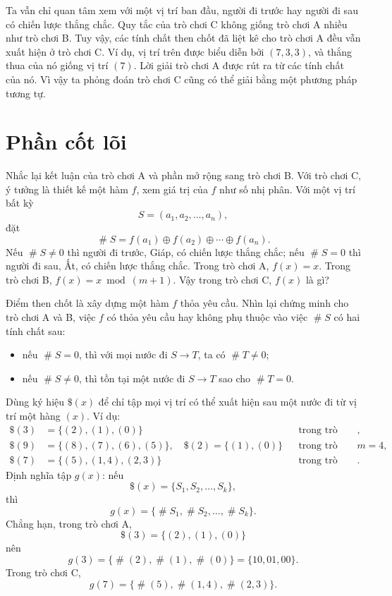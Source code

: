 \documentclass[11pt]{article}
\newcommand{\nimadd}{\oplus}
\newcommand{\val}[1]{\mathop{\#}\!#1}
\newcommand{\moves}[1]{\text{\$}(#1)}
\begin{document}
Ta vẫn chỉ quan tâm xem với một vị trí ban đầu, người đi trước hay người đi
sau có chiến lược thắng chắc. Quy tắc của trò chơi C không giống trò chơi A
nhiều như trò chơi B. Tuy vậy, các tính chất then chốt đã liệt kê cho trò
chơi A đều vẫn xuất hiện ở trò chơi C. Ví dụ, vị trí trên được biểu diễn bởi
\((7,3,3)\), và thắng thua của nó giống vị trí \((7)\). Lời giải trò chơi A
được rút ra từ các tính chất của nó. Vì vậy ta phỏng đoán trò chơi C cũng có
thể giải bằng một phương pháp tương tự.

\section{Phần cốt lõi}

Nhắc lại kết luận của trò chơi A và phần mở rộng sang trò chơi B. Với trò
chơi C, ý tưởng là thiết kế một hàm \(f\), xem giá trị của \(f\) như số nhị
phân. Với một vị trí bất kỳ
\[
  S=(a_1,a_2,\ldots,a_n),
\]
đặt
\[
  \val{S}=f(a_1)\nimadd f(a_2)\nimadd\cdots\nimadd f(a_n).
\]
Nếu \(\val{S}\ne0\) thì người đi trước, Giáp, có chiến lược thắng chắc; nếu
\(\val{S}=0\) thì người đi sau, Ất, có chiến lược thắng chắc. Trong trò chơi
A, \(f(x)=x\). Trong trò chơi B, \(f(x)=x\bmod(m+1)\). Vậy trong trò chơi C,
\(f(x)\) là gì?

Điểm then chốt là xây dựng một hàm \(f\) thỏa yêu cầu. Nhìn lại chứng minh
cho trò chơi A và B, việc \(f\) có thỏa yêu cầu hay không phụ thuộc vào việc
\(\val{S}\) có hai tính chất sau:
\begin{itemize}
  \item nếu \(\val{S}=0\), thì với mọi nước đi \(S\to T\), ta có
  \(\val{T}\ne0\);
  \item nếu \(\val{S}\ne0\), thì tồn tại một nước đi \(S\to T\) sao cho
  \(\val{T}=0\).
\end{itemize}

Dùng ký hiệu \(\moves{x}\) để chỉ tập mọi vị trí có thể xuất hiện sau một
nước đi từ vị trí một hàng \((x)\). Ví dụ:
\[
\begin{aligned}
  \moves{3}&=\{(2),(1),(0)\} &&\text{trong trò chơi A},\\
  \moves{9}&=\{(8),(7),(6),(5)\},\quad
  \moves{2}=\{(1),(0)\} &&\text{trong trò chơi B nếu }m=4,\\
  \moves{7}&=\{(5),(1,4),(2,3)\} &&\text{trong trò chơi C}.
\end{aligned}
\]
Định nghĩa tập \(g(x)\): nếu
\[
  \moves{x}=\{S_1,S_2,\ldots,S_k\},
\]
thì
\[
  g(x)=\{\val{S_1},\val{S_2},\ldots,\val{S_k}\}.
\]
Chẳng hạn, trong trò chơi A,
\[
  \moves{3}=\{(2),(1),(0)\}
\]
nên
\[
  g(3)=\{\val{(2)},\val{(1)},\val{(0)}\}=\{10,01,00\}.
\]
Trong trò chơi C,
\[
  g(7)=\{\val{(5)},\val{(1,4)},\val{(2,3)}\}.
\]
\end{document}
